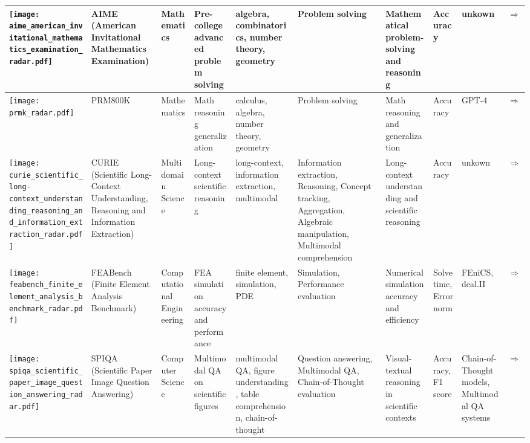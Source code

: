 \begin{landscape}
{\begin{longtable}{|p{}|p{}|p{}|p{}|p{}|p{}|p{}|p{}|p{}|p{}|}
\texttt{[image: aime\_american\_invitational\_mathematics\_examination\_radar.pdf]} & AIME (American Invitational Mathematics Examination) & Mathematics & Pre-college advanced problem solving & algebra, combinatorics, number theory, geometry & Problem solving & Mathematical problem-solving and reasoning & Accuracy & unkown & \cite{www-aime}\href{https://artofproblemsolving.com/wiki/index.php/AIME\_Problems\_and\_Solutions}{$\Rightarrow$} \\ \hline
\texttt{[image: prmk\_radar.pdf]} & PRM800K & Mathematics & Math reasoning generalization & calculus, algebra, number theory, geometry & Problem solving & Math reasoning and generalization & Accuracy & GPT-4 & \cite{lightman2023lets}\href{https://github.com/openai/prm800k/tree/main}{$\Rightarrow$} \\ \hline
\texttt{[image: curie\_scientific\_long-context\_understanding\_reasoning\_and\_information\_extraction\_radar.pdf]} & CURIE (Scientific Long-Context Understanding, Reasoning and Information Extraction) & Multidomain Science & Long-context scientific reasoning & long-context, information extraction, multimodal & Information extraction, Reasoning, Concept tracking, Aggregation, Algebraic manipulation, Multimodal comprehension & Long-context understanding and scientific reasoning & Accuracy & unkown & \cite{cui2025curieevaluatingllmsmultitask}\href{https://arxiv.org/abs/2503.13517}{$\Rightarrow$} \\ \hline
\texttt{[image: feabench\_finite\_element\_analysis\_benchmark\_radar.pdf]} & FEABench (Finite Element Analysis Benchmark) & Computational Engineering & FEA simulation accuracy and performance & finite element, simulation, PDE & Simulation, Performance evaluation & Numerical simulation accuracy and efficiency & Solve time, Error norm & FEniCS, deal.II & \cite{mudur2025feabenchevaluatinglanguagemodels}\href{https://github.com/google/feabench}{$\Rightarrow$} \\ \hline
\texttt{[image: spiqa\_scientific\_paper\_image\_question\_answering\_radar.pdf]} & SPIQA (Scientific Paper Image Question Answering) & Computer Science & Multimodal QA on scientific figures & multimodal QA, figure understanding, table comprehension, chain-of-thought & Question answering, Multimodal QA, Chain-of-Thought evaluation & Visual-textual reasoning in scientific contexts & Accuracy, F1 score & Chain-of-Thought models, Multimodal QA systems & \cite{zhong2024spiqa}\href{https://arxiv.org/abs/2407.09413}{$\Rightarrow$} \\ \hline

\end{longtable}}
\end{landscape}
